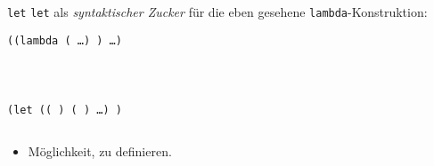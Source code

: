 \begin{frame}[t,fragile]{\texttt{let}}
	\texttt{let} als \textit{syntaktischer Zucker} für die eben gesehene \texttt{lambda}-Konstruktion: 
	
	\vspace*{0.5cm}

	\begin{minipage}{0.47\textwidth}
	\begin{center}
		\texttt{((lambda (  \dots) )   \dots)}
	\end{center}
	
	\inputminted[firstline=10,lastline=12]{scheme}{code/motivation-lokal.scm}	
	\end{minipage}~\pause\hspace*{0.5cm}~
	\begin{minipage}{0.47\textwidth}
	\begin{center}
		\texttt{(let ((~) (~) \dots) )}
	\end{center}
	
	\inputminted[firstline=14,lastline=16]{scheme}{code/motivation-lokal.scm}	
	\end{minipage}
	
	\vspace*{0.5cm}
	
	\begin{itemize}
		\item<3->[$\Rightarrow$] Möglichkeit,  zu definieren.
	\end{itemize}
	
\end{frame}

%	
%	
%		

